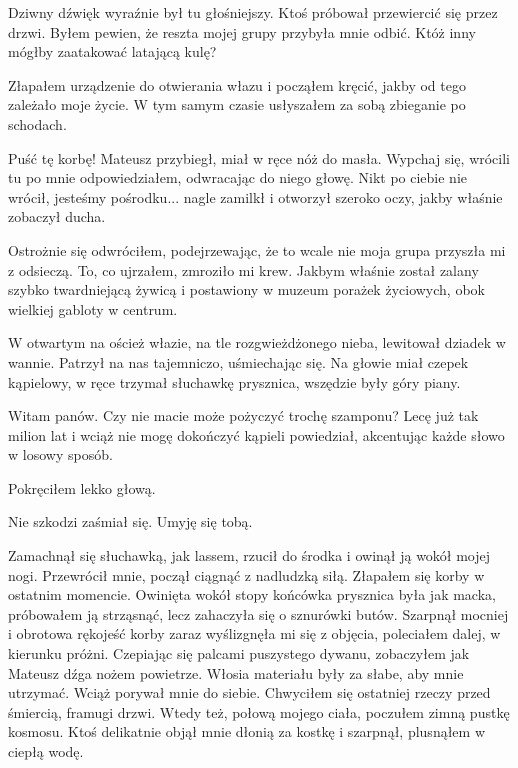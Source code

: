 Dziwny dźwięk wyraźnie był tu głośniejszy. Ktoś próbował przewiercić się przez drzwi.
Byłem pewien, że reszta mojej grupy przybyła mnie odbić.
Któż inny mógłby zaatakować latającą kulę?

Złapałem urządzenie do otwierania włazu i począłem kręcić, jakby od tego zależało moje życie.
W tym samym czasie usłyszałem za sobą zbieganie po schodach.
\begin{dialogue}
\ds{} Puść tę korbę! \dm{} Mateusz przybiegł, miał w ręce nóż do masła.
\ds{} Wypchaj się, wrócili tu po mnie \dm{} odpowiedziałem, odwracając do niego głowę.
\ds{} Nikt po ciebie nie wrócił, jesteśmy pośrodku... \dm{} nagle zamilkł i otworzył szeroko oczy, jakby właśnie zobaczył ducha.
\end{dialogue}
Ostrożnie się odwróciłem, podejrzewając, że to wcale nie moja grupa przyszła mi z odsieczą.
To, co ujrzałem, zmroziło mi krew. Jakbym właśnie został zalany szybko twardniejącą żywicą i postawiony w muzeum porażek życiowych, obok wielkiej gabloty w centrum.

W otwartym na oścież włazie, na tle rozgwieżdżonego nieba, lewitował dziadek w wannie.
Patrzył na nas tajemniczo, uśmiechając się. Na głowie miał czepek kąpielowy, w ręce trzymał słuchawkę prysznica, wszędzie były góry piany.
\begin{dialogue}
\ds{} Witam panów. Czy nie macie może pożyczyć trochę szamponu? Lecę już tak milion lat i wciąż nie mogę dokończyć kąpieli \dm{}
powiedział, akcentując każde słowo w losowy sposób.
\end{dialogue}
Pokręciłem lekko głową.
\begin{dialogue}
\ds{} Nie szkodzi \dm{} zaśmiał się. \dm{} Umyję się tobą.
\end{dialogue}
Zamachnął się słuchawką, jak lassem, rzucił do środka i owinął ją wokół mojej nogi.
Przewrócił mnie, począł ciągnąć z nadludzką siłą. Złapałem się korby w ostatnim momencie.
Owinięta wokół stopy końcówka prysznica była jak macka, próbowałem ją strząsnąć, lecz zahaczyła się o sznurówki butów.
Szarpnął mocniej i obrotowa rękojeść korby zaraz wyślizgnęła mi się z objęcia, poleciałem dalej, w kierunku próżni.
Czepiając się palcami puszystego dywanu, zobaczyłem jak Mateusz dźga nożem powietrze.
Włosia materiału były za słabe, aby mnie utrzymać. Wciąż porywał mnie do siebie. Chwyciłem się ostatniej rzeczy przed śmiercią, framugi drzwi.
Wtedy też, połową mojego ciała, poczułem zimną pustkę kosmosu.
Ktoś delikatnie objął mnie dłonią za kostkę i szarpnął, plusnąłem w ciepłą wodę.

